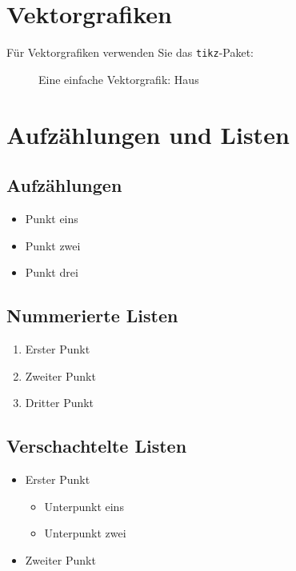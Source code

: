\section{Vektorgrafiken}

Für Vektorgrafiken verwenden Sie das \texttt{tikz}-Paket:

\begin{figure}[H]
    \centering
    \caption{Eine einfache Vektorgrafik: Haus}
    \label{fig:vektorgrafik}
\end{figure}



\section{Aufzählungen und Listen}

\subsection{Aufzählungen}
\begin{itemize}
  \item Punkt eins
  \item Punkt zwei
  \item Punkt drei
\end{itemize}

\subsection{Nummerierte Listen}
\begin{enumerate}
  \item Erster Punkt
  \item Zweiter Punkt
  \item Dritter Punkt
\end{enumerate}

\subsection{Verschachtelte Listen}
\begin{itemize}
  \item Erster Punkt
  \begin{itemize}
    \item Unterpunkt eins
    \item Unterpunkt zwei
  \end{itemize}
  \item Zweiter Punkt
\end{itemize}



